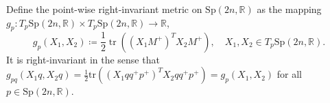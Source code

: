 Define the point-wise right-invariant metric on $\mathrm{Sp}(2n,\mathbb{R})$ as the mapping $g_{p}:T_{p}\mathrm{Sp}(2n,\mathbb{R})\times T_{p}\mathrm{Sp}(2n,\mathbb{R})\xrightarrow{}\mathbb{R}$, 
\begin{equation}\label{eq:sp_metric}
    g_{p}(X_{1},X_{2})\coloneqq\frac{1}{2}\operatorname{tr}((X_{1}M^{+})^{T}X_{2}M^{+}),\quad X_{1},X_{2}\in T_{p}\mathrm{Sp}(2n,\mathbb{R}).
\end{equation}
It is right-invariant in the sense that
$g_{pq}(X_{1}q,X_{2}q)=\tfrac{1}{2}\mathrm{tr}((X_{1}qq^{+}p^{+})^{T}X_{2}qq^{+}p^{+})=g_{p}(X_{1},X_{2})$ for all $p\in \mathrm{Sp}(2n,\mathbb{R})$.